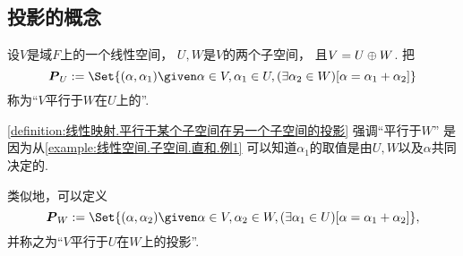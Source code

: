 \subsection{投影的概念}
\begin{definition}\label{definition:线性映射.平行于某个子空间在另一个子空间的投影}
设\(V\)是域\(F\)上的一个线性空间，
\(U,W\)是\(V\)的两个子空间，
且\(V=U \oplus W\).
把\begin{equation*}
	\vb{P}_U
	\defeq
	\Set{
		(\alpha,\alpha_1)
		\given
		\alpha \in V,
		\alpha_1 \in U,
		(\exists \alpha_2 \in W)
		[\alpha=\alpha_1+\alpha_2]
	}
\end{equation*}
称为“\(V\)平行于\(W\)在\(U\)上的”.
\end{definition}
\begin{remark}
\cref{definition:线性映射.平行于某个子空间在另一个子空间的投影}
强调“平行于\(W\)”
是因为从\cref{example:线性空间.子空间.直和.例1}
可以知道\(\alpha_1\)的取值是由\(U,W\)以及\(\alpha\)共同决定的.
\end{remark}
\begin{remark}
类似地，可以定义\begin{equation*}
	\vb{P}_W
	\defeq
	\Set{
		(\alpha,\alpha_2)
		\given
		\alpha \in V,
		\alpha_2 \in W,
		(\exists \alpha_1 \in U)
		[\alpha=\alpha_1+\alpha_2]
	},
\end{equation*}
并称之为“\(V\)平行于\(U\)在\(W\)上的投影”.
\end{remark}

